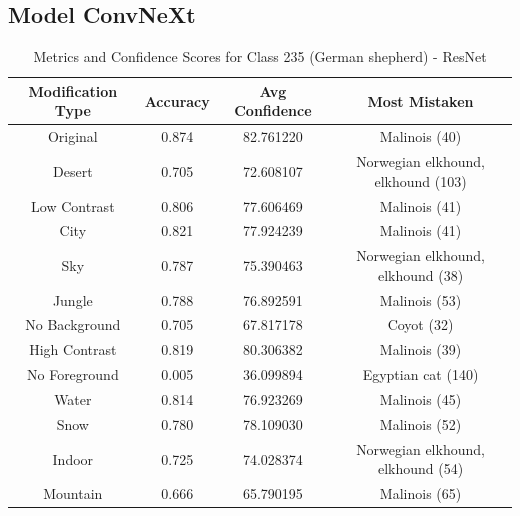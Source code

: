 \subsection*{Model ConvNeXt}


\begin{table}
	\centering
	\begin{tabular}{|c|c|c|c|}
		\hline
		\textbf{Modification Type} & \textbf{Accuracy} & \textbf{Avg Confidence} & \textbf{Most Mistaken} \\
		\hline
		Original & 0.874 & 82.761220 & Malinois (40) \\
		\hline
		Desert & 0.705 & 72.608107 & Norwegian elkhound, elkhound (103) \\
		\hline
		Low Contrast & 0.806 & 77.606469 & Malinois (41) \\
		\hline
		City & 0.821 & 77.924239 & Malinois (41) \\
		\hline
		Sky & 0.787 & 75.390463 & Norwegian elkhound, elkhound (38) \\
		\hline
		Jungle & 0.788 & 76.892591 & Malinois (53) \\
		\hline
		No Background & 0.705 & 67.817178 & Coyot (32) \\
		\hline
		High Contrast & 0.819 & 80.306382 & Malinois (39) \\
		\hline
		No Foreground & 0.005 & 36.099894 & Egyptian cat (140) \\
		\hline
		Water & 0.814 & 76.923269 & Malinois (45) \\
		\hline
		Snow & 0.780 & 78.109030 & Malinois (52) \\
		\hline
		Indoor & 0.725 & 74.028374 & Norwegian elkhound, elkhound (54) \\
		\hline
		Mountain & 0.666 & 65.790195 & Malinois (65) \\
		\hline
	\end{tabular}
	\caption{Metrics and Confidence Scores for Class 235 (German shepherd) - ResNet}
	\label{tab:metrics_confidence_class_235_resnet}
\end{table}


